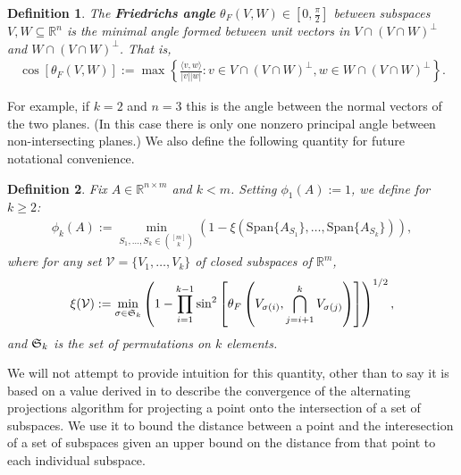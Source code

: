 \documentclass[journal, onecolumn]{IEEEtran}
\newtheorem{definition}{Definition}
\begin{document}
\begin{definition}\label{FriedrichsDefinition}
The \textbf{Friedrichs angle} $\theta_F(V,W) \in [0,\frac{\pi}{2}]$ between subspaces $V,W \subseteq \mathbb{R}^n$ is the minimal angle formed between unit vectors in $V \cap (V \cap W)^\perp$ and $W \cap (V \cap W)^\perp$. That is,
\begin{align}
\cos\left[\theta_F(V,W)\right] := \max\left\{ \frac{ \langle v, w \rangle }{|v||w|}: v \in V \cap (V \cap W)^\perp, w \in W \cap (V \cap W)^\perp \right\}.
\end{align}
\end{definition}

For example, if $k=2$ and $n=3$ this is the angle between the normal vectors of the two planes. (In this case there is only one nonzero principal angle between non-intersecting planes.) We also define the following quantity for future notational convenience.

\begin{definition}\label{SpecialSupportSet}
Fix $A \in \mathbb{R}^{n \times m}$ and $k < m$. Setting $\phi_1(A) := 1$, we define for $k \geq 2$:
\begin{align}\label{rho}
\phi_k(A) := \min_{ S_1,\ldots,S_k \in {[m] \choose k} } \left(1 - \xi( \text{Span}\{A_{S_1}\}, \ldots,  \text{Span}\{A_{S_k}\}) \right),
\end{align}
where for any set $\mathcal{V} = \{V_1, \ldots, V_k\}$ of closed subspaces of $\mathbb{R}^m$, 
\begin{align}
\xi(\mathcal{V}) := \min_{\sigma \in \frak{S}_k} \left(1 - \prod_{i=1}^{k-1} \sin^2\left[ \theta_F \left(V_{\sigma(i)}, \bigcap_{j=i+1}^k V_{\sigma(j)}\right) \right]  \right)^{1/2},
\end{align}
%
and $\frak{S}_k$ is the set of permutations on $k$ elements. 
\end{definition}

We will not attempt to provide intuition for this quantity, other than to say it is based on a value derived in \cite{Deutsch} to describe the convergence of the alternating projections algorithm for projecting a point onto the intersection of a set of subspaces. We use it to bound the distance between a point and the interesection of a set of subspaces given an upper bound on the distance from that point to each individual subspace. 

\end{document}
